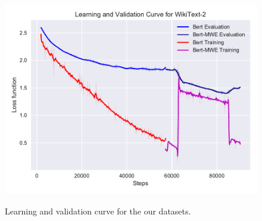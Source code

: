 \begin{figure}
\begin{minipage}[b]{.33\linewidth}
\label{fig:manual-eval2}
\end{minipage}
\begin{minipage}[b]{.33\linewidth}
 \includegraphics[width=\linewidth]{fig/w.pdf}
\label{fig:manual-eval2}
\end{minipage}
\vspace{-15pt}
\caption{Learning and validation curve for the our datasets.}
\label{fig:learning-curve}
\end{figure}





